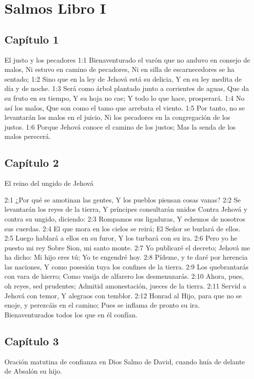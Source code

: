 \chapter{Salmos Libro I}
\section*{Capítulo  1}
El justo y los pecadores 
1:1 Bienaventurado el varón que no anduvo en consejo de malos, 
Ni estuvo en camino de pecadores, 
Ni en silla de escarnecedores se ha sentado; 
1:2 Sino que en la ley de Jehová está su delicia, 
Y en su ley medita de día y de noche. 
1:3 Será como árbol plantado junto a corrientes de aguas, 
Que da su fruto en su tiempo, 
Y su hoja no cae; 
Y todo lo que hace, prosperará. 
1:4 No así los malos, 
Que son como el tamo que arrebata el viento. 
1:5 Por tanto, no se levantarán los malos en el juicio, 
Ni los pecadores en la congregación de los justos. 
1:6 Porque Jehová conoce el camino de los justos; 
Mas la senda de los malos perecerá. 
\section*{Capítulo 2}
El reino del ungido de Jehová 

2:1 ¿Por qué se amotinan las gentes, 
Y los pueblos piensan cosas vanas? 
2:2 Se levantarán los reyes de la tierra, 
Y príncipes consultarán unidos 
Contra Jehová y contra su ungido, diciendo: 
2:3 Rompamos sus ligaduras, 
Y echemos de nosotros sus cuerdas. 
2:4 El que mora en los cielos se reirá; 
El Señor se burlará de ellos. 
2:5 Luego hablará a ellos en su furor, 
Y los turbará con su ira. 
2:6 Pero yo he puesto mi rey 
Sobre Sion, mi santo monte. 
2:7 Yo publicaré el decreto; 
Jehová me ha dicho: Mi hijo eres tú; 
Yo te engendré hoy. 
2:8 Pídeme, y te daré por herencia las naciones, 
Y como posesión tuya los confines de la tierra. 
2:9 Los quebrantarás con vara de hierro; 
Como vasija de alfarero los desmenuzarás. 
2:10 Ahora, pues, oh reyes, sed prudentes; 
Admitid amonestación, jueces de la tierra. 
2:11 Servid a Jehová con temor, 
Y alegraos con temblor. 
2:12 Honrad al Hijo, para que no se enoje, y perezcáis en el camino; 
Pues se inflama de pronto su ira. 
Bienaventurados todos los que en él confían. 
\section*{Capítulo 3}
Oración matutina de confianza en Dios 
Salmo de David, cuando huía de delante de Absalón su hijo. 


